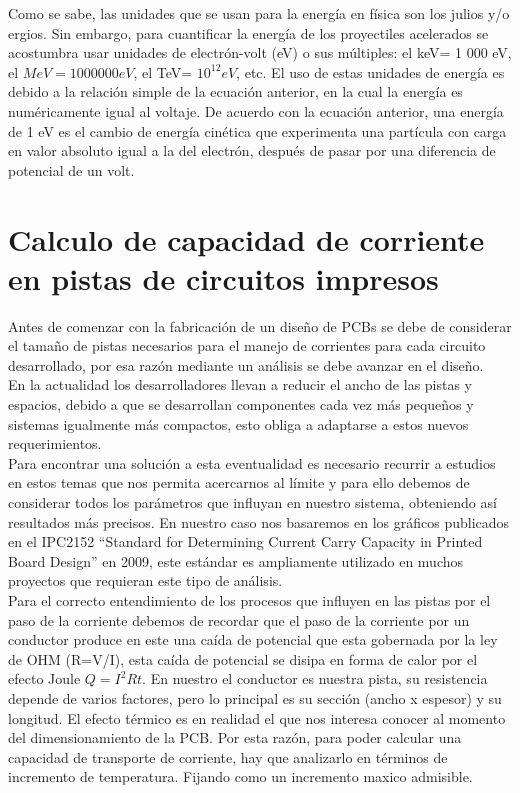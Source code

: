 Como se sabe, las unidades que se usan para la energía en física son los julios
y/o ergios. Sin embargo, para cuantificar la energía de los proyectiles acelerados se acostumbra usar unidades de electrón-volt (eV) o sus múltiples: el keV= 1 000 eV, el $MeV= 1 000 000 eV$, el TeV= $10^{12} eV$, etc. El uso de estas unidades de energía
es debido a la relación simple de la ecuación anterior, en la cual la energía es
numéricamente igual al voltaje. De acuerdo con la ecuación anterior, una energía
de 1 eV es el cambio de energía cinética que experimenta una partícula con carga
en valor absoluto igual a la del electrón, después de pasar por una diferencia de
potencial de un volt. \cite{acelerado}

\section{Calculo de capacidad de corriente en pistas de circuitos impresos}



Antes de comenzar con la fabricación de un diseño de PCBs se debe de considerar el tamaño de pistas necesarios para el manejo de corrientes para cada circuito desarrollado, por esa razón mediante un análisis se debe avanzar en el diseño.\\

En la actualidad los desarrolladores llevan a reducir el ancho de las pistas y espacios, debido a que se desarrollan componentes cada vez más pequeños y sistemas igualmente más compactos, esto obliga a adaptarse a estos nuevos requerimientos.\\

Para encontrar una solución a esta eventualidad es necesario recurrir a estudios en estos temas que nos permita acercarnos al límite y para ello debemos de considerar todos los parámetros que influyan en nuestro sistema, obteniendo así resultados más precisos. En nuestro caso nos basaremos en los gráficos publicados en el IPC2152 \cite{IPC 2152} ``Standard for Determining Current Carry Capacity in Printed Board Design'' en 2009, este estándar es ampliamente utilizado en muchos proyectos que requieran este tipo de análisis. \\

Para el correcto entendimiento de los procesos que influyen en las pistas por el paso de la corriente debemos de recordar que el paso de la corriente por un conductor produce en este una caída de potencial que esta gobernada por la ley de OHM (R=V/I), esta caída de potencial se disipa en forma de calor por el efecto Joule $Q=I^{2}Rt$. En nuestro el conductor es nuestra pista, su resistencia depende de varios factores, pero lo principal es su sección (ancho x espesor) y su longitud. El efecto térmico es en realidad el que nos interesa conocer al momento del dimensionamiento de la PCB. Por esta razón, para poder calcular una capacidad de transporte de corriente, hay que analizarlo en términos de incremento de temperatura. Fijando como un incremento maxico admisible.\\


